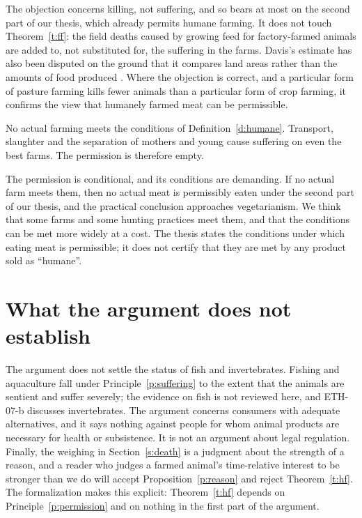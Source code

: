 \documentclass{situationist-preprint}
\begin{document}
\begin{reply}
The objection concerns killing, not suffering, and so bears at most on the second part of our thesis, which already permits humane farming. It does not touch Theorem~\ref{t:ff}: the field deaths caused by growing feed for factory-farmed animals are added to, not substituted for, the suffering in the farms. Davis's estimate has also been disputed on the ground that it compares land areas rather than the amounts of food produced \citep{Matheny2003}. Where the objection is correct, and a particular form of pasture farming kills fewer animals than a particular form of crop farming, it confirms the view that humanely farmed meat can be permissible.
\end{reply}

\begin{objection}
No actual farming meets the conditions of Definition~\ref{d:humane}. Transport, slaughter and the separation of mothers and young cause suffering on even the best farms. The permission is therefore empty.
\end{objection}

\begin{reply}
The permission is conditional, and its conditions are demanding. If no actual farm meets them, then no actual meat is permissibly eaten under the second part of our thesis, and the practical conclusion approaches vegetarianism. We think that some farms and some hunting practices meet them, and that the conditions can be met more widely at a cost. The thesis states the conditions under which eating meat is permissible; it does not certify that they are met by any product sold as \enquote{humane}.
\end{reply}

\section{What the argument does not establish}

The argument does not settle the status of fish and invertebrates. Fishing and aquaculture fall under Principle~\ref{p:suffering} to the extent that the animals are sentient and suffer severely; the evidence on fish is not reviewed here, and ETH-07-b discusses invertebrates. The argument concerns consumers with adequate alternatives, and it says nothing against people for whom animal products are necessary for health or subsistence. It is not an argument about legal regulation. Finally, the weighing in Section~\ref{s:death} is a judgment about the strength of a reason, and a reader who judges a farmed animal's time-relative interest to be stronger than we do will accept Proposition~\ref{p:reason} and reject Theorem~\ref{t:hf}. The formalization makes this explicit: Theorem~\ref{t:hf} depends on Principle~\ref{p:permission} and on nothing in the first part of the argument.
\end{document}
